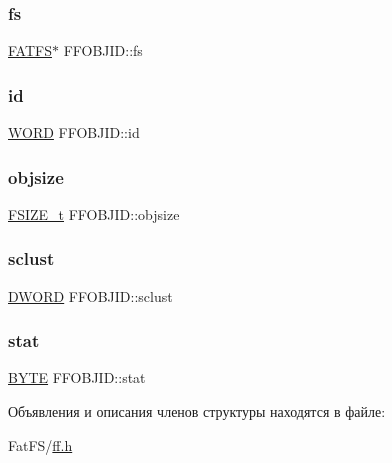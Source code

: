 \mbox{\label{struct_f_f_o_b_j_i_d_a867089659a2374d44ab917c60037fe5c}} 
\subsubsection{\texorpdfstring{fs}{fs}}
{\footnotesize\ttfamily \mbox{\hyperlink{struct_f_a_t_f_s}{F\+A\+T\+FS}}$\ast$ F\+F\+O\+B\+J\+I\+D\+::fs}

\mbox{\label{struct_f_f_o_b_j_i_d_afc765e01ff97bfd9645c42b0ba30397f}} 
\subsubsection{\texorpdfstring{id}{id}}
{\footnotesize\ttfamily \mbox{\hyperlink{ff_8h_a197942eefa7db30960ae396d68339b97}{W\+O\+RD}} F\+F\+O\+B\+J\+I\+D\+::id}

\mbox{\label{struct_f_f_o_b_j_i_d_a83c51ba99687054f0cc653b45f195268}} 
\subsubsection{\texorpdfstring{objsize}{objsize}}
{\footnotesize\ttfamily \mbox{\hyperlink{ff_8h_a3fc0992ad7436250b6b1a0592214b7f2}{F\+S\+I\+Z\+E\+\_\+t}} F\+F\+O\+B\+J\+I\+D\+::objsize}

\mbox{\label{struct_f_f_o_b_j_i_d_ad990393e2ddf16f73671ded4b751becb}} 
\subsubsection{\texorpdfstring{sclust}{sclust}}
{\footnotesize\ttfamily \mbox{\hyperlink{ff_8h_ad342ac907eb044443153a22f964bf0af}{D\+W\+O\+RD}} F\+F\+O\+B\+J\+I\+D\+::sclust}

\mbox{\label{struct_f_f_o_b_j_i_d_aa7bfa8dd8958d11df042a67e1da25f63}} 
\subsubsection{\texorpdfstring{stat}{stat}}
{\footnotesize\ttfamily \mbox{\hyperlink{ff_8h_a4ae1dab0fb4b072a66584546209e7d58}{B\+Y\+TE}} F\+F\+O\+B\+J\+I\+D\+::stat}



Объявления и описания членов структуры находятся в файле\+:\begin{DoxyCompactItemize}
\item 
Fat\+F\+S/\mbox{\hyperlink{ff_8h}{ff.\+h}}\end{DoxyCompactItemize}
